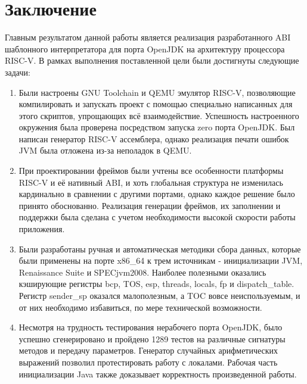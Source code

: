 \section*{Заключение}

Главным результатом данной работы является реализация разработанного ABI шаблонного интерпретатора для порта OpenJDK на архитектуру процессора RISC-V. В рамках выполнения поставленной цели были достигнуты следующие задачи:

\begin{enumerate}
    \item Были настроены GNU Toolchain и QEMU эмулятор RISC-V, позволяющие компилировать и запускать проект с помощью специально написанных для этого скриптов, упрощающих всё взаимодействие. Успешность настроенного окружения была проверена посредством запуска zero порта OpenJDK. Был написан генератор RISC-V ассемблера, однако реализация печати ошибок JVM была отложена из-за неполадок в QEMU.
    
    \item При проектировании фреймов были учтены все особенности платформы RISC-V и её нативный ABI, и хоть глобальная структура не изменилась кардинально в сравнении с другими портами, однако каждое решение было принято обоснованно. Реализация генерации фреймов, их заполнении и поддержки была сделана с учетом необходимости высокой скорости работы приложения.
    
    \item Были разработаны ручная и автоматическая методики сбора данных, которые были применены на порте x86_64 к трем источникам - инициализации JVM, Renaissance Suite и SPECjvm2008. Наиболее полезными оказались кэширующие регистры bcp, TOS, esp, threads, locals, fp и dispatch\_table. Регистр sender\_sp оказался малополезным, а TOC вовсе неиспользуемым, и от них необходимо избавиться, по мере технической возможности.
    
    \item Несмотря на трудность тестирования нерабочего порта OpenJDK, было успешно сгенерировано и пройдено 1289 тестов на различные сигнатуры методов и передачу параметров. Генератор случайных арифметических выражений позволил протестировать работу с локалами. Рабочая часть инициализации Java также доказывает корректность произведенной работы.
\end{enumerate}

